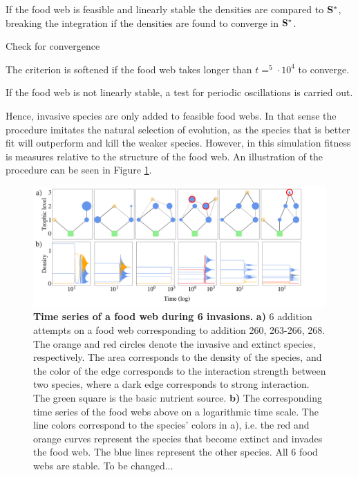If the food web is feasible and linearly stable the densities are compared to $\bf{S^*}$, breaking the integration if the densities are found to converge in $\bf{S^*}$.

\begin{algorithm}
\SetAlgoLined
{}
 \caption{Check for convergence}
 \label{CODE:convergence}
\end{algorithm}
The criterion is softened if the food web takes longer than $t = ^5\cdot10^4$ %
to converge.

If the food web is not linearly stable, a test for periodic oscillations is carried out.

Hence, invasive species are only added to feasible food webs. In that sense the procedure imitates the natural selection of evolution, as the species that is better fit will outperform and kill the weaker species. However, in this simulation fitness is measures relative to the structure of the food web. An illustration of the procedure can be seen in Figure \ref{FIG:evolution}.

\begin{figure}
    \centering
		\includegraphics[scale = 0.13]{figs/evolution.png}
	    \caption{\textbf{Time series of a food web during 6 invasions.} \textbf{a)} 6 addition attempts on a food web corresponding to addition 260, 263-266, 268. The orange and red circles denote the invasive and extinct species, respectively. 
        The area corresponds to the density of the species, and the color of the edge corresponds to the interaction strength between two species, where a dark edge corresponds to strong interaction. The green square is the basic nutrient source. \textbf{b)} The corresponding time series of the food webs above on a logarithmic time scale. 
        The line colors correspond to the species' colors in a), i.e. the red and orange curves represent the species that become extinct and invades the food web. The blue lines represent the other species. All 6 food webs are stable. To be changed...}
	    \label{FIG:evolution}
\end{figure}

